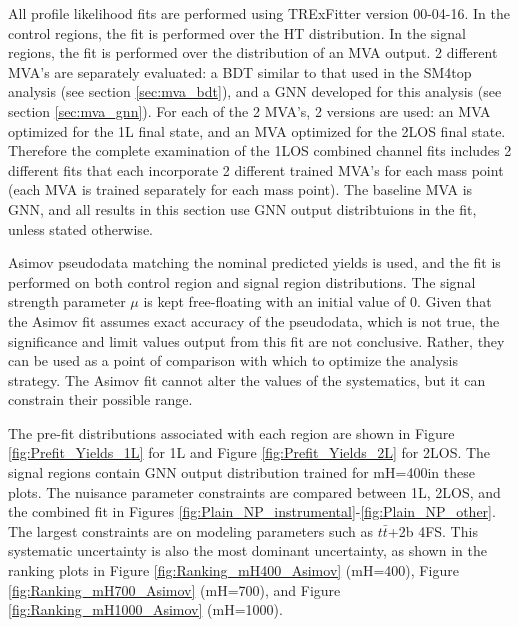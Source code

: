 %
All profile likelihood fits are performed using TRExFitter version 00-04-16. In the control regions, the fit is performed over the HT distribution. In the signal regions, the fit is performed over the distribution of an MVA output. 2 different MVA’s are separately evaluated: a BDT similar to that used in the SM4top analysis (see section \ref{sec:mva_bdt}), and a GNN developed for this analysis (see section \ref{sec:mva_gnn}). For each of the 2 MVA’s, 2 versions are used: an MVA optimized for the 1L final state, and an MVA optimized for the 2LOS final state. Therefore the complete examination of the 1LOS combined channel fits includes 2 different fits that each incorporate 2 different trained MVA’s for each mass point (each MVA is trained separately for each mass point). The baseline MVA is GNN, and all results in this section use GNN output distribtuions in the fit, unless stated otherwise.

Asimov pseudodata matching the nominal predicted yields is used, and the fit is performed on both control region and signal region distributions. The signal strength parameter $\mu$ is kept free-floating with an initial value of 0. Given that the Asimov fit assumes exact accuracy of the pseudodata, which is not true, the significance and limit values output from this fit are not conclusive. Rather, they can be used as a point of comparison with which to optimize the analysis strategy. The Asimov fit cannot alter the values of the systematics, but it can constrain their possible range.

The pre-fit distributions associated with each region are shown in Figure \ref{fig:Prefit_Yields_1L} for 1L and Figure \ref{fig:Prefit_Yields_2L} for 2LOS. The signal regions contain GNN output distribution trained for mH=400\gev in these plots. The nuisance parameter constraints are compared between 1L, 2LOS, and the combined fit in Figures \ref{fig:Plain_NP_instrumental}-\ref{fig:Plain_NP_other}. The largest constraints are on \ttbar modeling parameters such as $t\bar{t}$+2b 4FS. This systematic uncertainty is also the most dominant uncertainty, as shown in the ranking plots in Figure \ref{fig:Ranking_mH400_Asimov} (mH=400\gev), Figure \ref{fig:Ranking_mH700_Asimov} (mH=700\gev), and Figure \ref{fig:Ranking_mH1000_Asimov} (mH=1000\gev).

